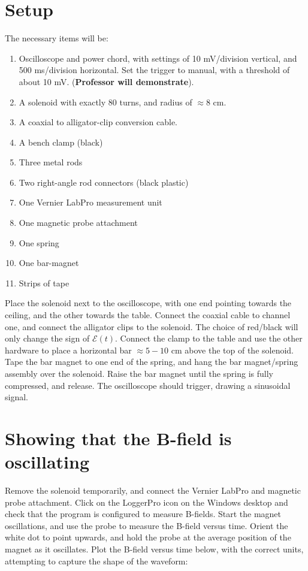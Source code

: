 \documentclass[12pt]{article}
\begin{document}
\section{Setup}

The necessary items will be:

\begin{enumerate}
\item Oscilloscope and power chord, with settings of 10 mV/division vertical, and 500 ms/division horizontal.  Set the trigger to manual, with a threshold of about 10 mV. (\textbf{Professor will demonstrate}).
\item A solenoid with exactly 80 turns, and radius of $\approx 8$ cm.
\item A coaxial to alligator-clip conversion cable.
\item A bench clamp (black)
\item Three metal rods
\item Two right-angle rod connectors (black plastic)
\item One Vernier LabPro measurement unit
\item One magnetic probe attachment
\item One spring
\item One bar-magnet
\item Strips of tape
\end{enumerate}

Place the solenoid next to the oscilloscope, with one end pointing towards the ceiling, and the other towards the table.  Connect the coaxial cable to channel one, and connect the alligator clips to the solenoid.  The choice of red/black will only change the sign of $\mathcal{E}(t)$.  Connect the clamp to the table and use the other hardware to place a horizontal bar $\approx 5-10$ cm above the top of the solenoid.  Tape the bar magnet to one end of the spring, and hang the bar magnet/spring assembly over the solenoid.  Raise the bar magnet until the spring is fully compressed, and release.  The oscilloscope should trigger, drawing a sinusoidal signal.

\section{Showing that the B-field is oscillating}

Remove the solenoid temporarily, and connect the Vernier LabPro and magnetic probe attachment.  Click on the LoggerPro icon on the Windows desktop and check that the program is configured to measure B-fields. Start the magnet oscillations, and use the probe to measure the B-field versus time.  Orient the white dot to point upwards, and hold the probe at the average position of the magnet as it oscillates. Plot the B-field versus time below, with the correct units, attempting to capture the shape of the waveform: \\ \vspace{3cm}
\end{document}
